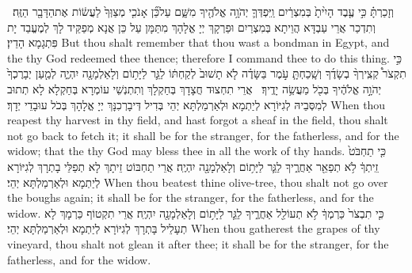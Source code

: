 {וְזָכַרְתָּ֗ כִּ֣י עֶ֤בֶד הָיִ֙יתָ֙ בְּמִצְרַ֔יִם וַֽיִּפְדְּךָ֛ יְהֹוָ֥ה אֱלֹהֶ֖יךָ מִשָּׁ֑ם עַל\maqqaf כֵּ֞ן אָנֹכִ֤י מְצַוְּךָ֙ לַעֲשׂ֔וֹת אֶת\maqqaf הַדָּבָ֖ר הַזֶּֽה׃ \setuma }
{וְתִדְכַר אֲרֵי עַבְדָּא הֲוֵיתָא בְּמִצְרַיִם וּפַרְקָךְ יְיָ אֱלָהָךְ מִתַּמָּן עַל כֵּן אֲנָא מְפַקֵּיד לָךְ לְמֶעֱבַד יָת פִּתְגָמָא הָדֵין׃}
{But thou shalt remember that thou wast a bondman in Egypt, and the \lord\space thy God redeemed thee thence; therefore I command thee to do this thing.}{}
\newseder
{}%
{כִּ֣י תִקְצֹר֩ קְצִֽירְךָ֨ בְשָׂדֶ֜ךָ וְשָֽׁכַחְתָּ֧ עֹ֣מֶר בַּשָּׂדֶ֗ה לֹ֤א תָשׁוּב֙ לְקַחְתּ֔וֹ לַגֵּ֛ר לַיָּת֥וֹם וְלָאַלְמָנָ֖ה יִהְיֶ֑ה לְמַ֤עַן יְבָרֶכְךָ֙ יְהֹוָ֣ה אֱלֹהֶ֔יךָ בְּכֹ֖ל מַעֲשֵׂ֥ה יָדֶֽיךָ׃ \setuma }
{אֲרֵי תִחְצוּד חֲצָדָךְ בְּחַקְלָךְ וְתִתְנְשֵׁי עוֹמְרָא בְּחַקְלָא לָא תְתוּב לְמִסְּבֵיהּ לְגִיּוֹרָא לְיַתְמָא וּלְאַרְמַלְתָּא יְהֵי בְּדִיל דְּיבָרְכִנָּךְ יְיָ אֱלָהָךְ בְּכֹל עוּבָדֵי יְדָךְ׃}
{When thou reapest thy harvest in thy field, and hast forgot a sheaf in the field, thou shalt not go back to fetch it; it shall be for the stranger, for the fatherless, and for the widow; that the \lord\space thy God may bless thee in all the work of thy hands.}{}
{כִּ֤י תַחְבֹּט֙ זֵֽיתְךָ֔ לֹ֥א תְפַאֵ֖ר אַחֲרֶ֑יךָ לַגֵּ֛ר לַיָּת֥וֹם וְלָאַלְמָנָ֖ה יִהְיֶֽה׃}
{אֲרֵי תַחְבּוֹט זֵיתָךְ לָא תְפַלֵּי בָתְרָךְ לְגִיּוֹרָא לְיַתְמָא וּלְאַרְמַלְתָּא יְהֵי׃}
{When thou beatest thine olive-tree, thou shalt not go over the boughs again; it shall be for the stranger, for the fatherless, and for the widow.}{}
{כִּ֤י תִבְצֹר֙ כַּרְמְךָ֔ לֹ֥א תְעוֹלֵ֖ל אַחֲרֶ֑יךָ לַגֵּ֛ר לַיָּת֥וֹם וְלָאַלְמָנָ֖ה יִהְיֶֽה׃}
{אֲרֵי תִקְטוֹף כַּרְמָךְ לָא תְעָלֵיל בָּתְרָךְ לְגִיּוֹרָא לְיַתְמָא וּלְאַרְמַלְתָּא יְהֵי׃}
{When thou gatherest the grapes of thy vineyard, thou shalt not glean it after thee; it shall be for the stranger, for the fatherless, and for the widow.}{}
